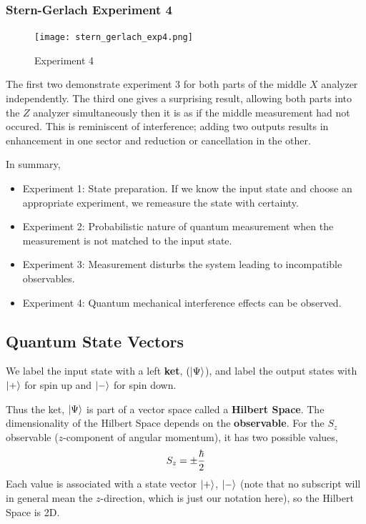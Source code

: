\documentclass[english, 11pt]{article}
\begin{document}
      \subsubsection{Stern-Gerlach Experiment 4}

         \begin{figure}[t!]
            \centering
            \texttt{[image: stern\_gerlach\_exp4.png]}
            \caption{Experiment 4}
         \end{figure}

         The first two demonstrate experiment 3 for both parts of the middle $X$ analyzer independently. The third one gives a surprising result, allowing both parts into the $Z$ analyzer simultaneously then it is as if the middle measurement had not occured. This is reminiscent of interference; adding two outputs results in enhancement in one sector and reduction or cancellation in the other.
         \newline

       In summary,

       \begin{itemize}
         \item Experiment 1: State preparation. If we know the input state and choose an appropriate experiment, we remeasure the state with certainty.
         \item Experiment 2: Probabilistic nature of quantum measurement when the measurement is not matched to the input state.
         \item Experiment 3: Measurement disturbs the system leading to incompatible observables.
         \item Experiment 4: Quantum mechanical interference effects can be observed.
       \end{itemize}

       \subsection{Quantum State Vectors}

         \begin{defn}[Postulate 1]\label{postulate_1}
         We label the input state with a left \textbf{ket}, $(\left|\Psi\right\rangle$), and label the output states with $\left|+\right\rangle$ for spin up and $\left|-\right\rangle$ for spin down.
         \end{defn}

         Thus the ket, $\left|\Psi\right\rangle$ is part of a vector space called a \textbf{Hilbert Space}. The dimensionality of the Hilbert Space depends on the \textbf{observable}. For the $S_z$ observable ($z$-component of angular momentum), it has two possible values,
         \[ S_z = \pm \frac{\hbar}{2} \]
         Each value is associated with a state vector $\left|+\right\rangle$, $\left|-\right\rangle$ (note that no subscript will in general mean the $z$-direction, which is just our notation here), so the Hilbert Space is 2D.
\end{document}
